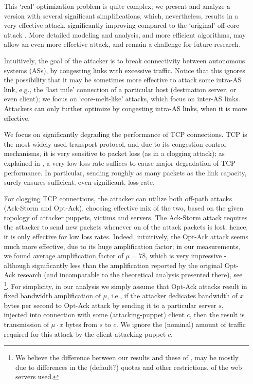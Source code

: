 \documentclass[conference]{IEEEtran}
\newcommand{\ampfact}{\mu}
\begin{document}
This `real' optimization problem is quite complex; we present and analyze a version with several significant simplifications, which, nevertheless, results in a very effective attack, significantly improving compared to the `original' off-core attack \cite{conf/esorics/StuderP09}. More detailed modeling and analysis, and more efficient algorithms, may allow an even more effective attack, and remain a challenge for future research.


Intuitively, the goal of the attacker is to break connectivity between autonomous systems (ASs), by congesting links with excessive traffic. Notice that this ignores the possibility that it may be sometimes more effective to attack some intra-AS link, e.g., the `last mile' connection of a particular host (destination server, or even client); we focus on `core-melt-like' attacks, which focus on inter-AS links. Attackers can only further optimize by congesting intra-AS links, when it is more effective. 

We focus on significantly degrading the performance of TCP connections. TCP is the most widely-used transport protocol, and due to its congestion-control mechanisms, it is very sensitive to packet loss (as in a clogging attack); as explained in \cite{AH11:Ack}, a very low loss rate suffices to cause major degradation of TCP performance. In particular, sending roughly as many packets as the link capacity, surely ensures sufficient, even significant, loss rate. 

For clogging TCP connections, the attacker can utilize both off-path attacks (Ack-Storm and Opt-Ack), choosing effective mix of the two, based on the given topology of attacker puppets, victims and servers. The Ack-Storm attack requires the attacker to send new packets whenever on of the attack packets is lost; hence, it is only effective for low loss rates. Indeed, intuitively, the Opt-Ack attack seems much more effective, due to its huge amplification factor; in our measurements, we found average amplification factor of $\ampfact=78$, which is very impressive - although significantly less than the amplification reported by the original Opt-Ack research (and incomparable to the theoretical analysis presented there), see \cite{SBB05:OptAck}\footnote{We believe the difference between our results  and these of \cite{SBB05:OptAck}, may be mostly due to differences in the (default?) quotas and other restrictions, of the web servers used.}. For simplicity, in our analysis we simply assume that Opt-Ack attacks result in fixed bandwidth amplification of $\ampfact$, i.e., if the attacker dedicates bandwidth of $x$ bytes per second to Opt-Ack attack by sending it to a particular server $s$, injected into connection with some (attacking-puppet) client $c$, then the result is transmission of $\ampfact\cdot x$ bytes from $s$ to $c$. We ignore the (nominal) amount of traffic required for this attack by the client attacking-puppet $c$. 
\end{document}
